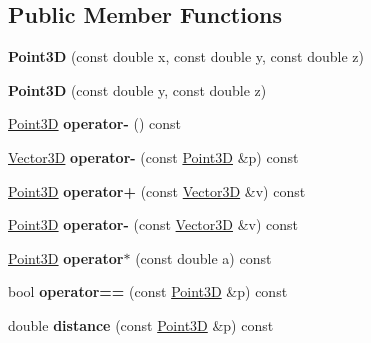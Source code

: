 \subsection*{Public Member Functions}
\begin{DoxyCompactItemize}
\item 
\hypertarget{class_point3_d_a72799f11be08ba98bb37cfcf2fa0bb1f}{}\label{class_point3_d_a72799f11be08ba98bb37cfcf2fa0bb1f} 
{\bfseries Point3D} (const double x, const double y, const double z)
\item 
\hypertarget{class_point3_d_af963fbdffd449c8fc2d0631992a996e1}{}\label{class_point3_d_af963fbdffd449c8fc2d0631992a996e1} 
{\bfseries Point3D} (const double y, const double z)
\item 
\hypertarget{class_point3_d_a7ac9d9c06fe0497d868537d2f6ad9454}{}\label{class_point3_d_a7ac9d9c06fe0497d868537d2f6ad9454} 
\hyperlink{class_point3_d}{Point3D} {\bfseries operator-\/} () const
\item 
\hypertarget{class_point3_d_a6cb0fe83bc148a42fb2cf6f9aa907242}{}\label{class_point3_d_a6cb0fe83bc148a42fb2cf6f9aa907242} 
\hyperlink{class_vector3_d}{Vector3D} {\bfseries operator-\/} (const \hyperlink{class_point3_d}{Point3D} \&p) const
\item 
\hypertarget{class_point3_d_a2ab1c2f322e1845e94414fab67139667}{}\label{class_point3_d_a2ab1c2f322e1845e94414fab67139667} 
\hyperlink{class_point3_d}{Point3D} {\bfseries operator+} (const \hyperlink{class_vector3_d}{Vector3D} \&v) const
\item 
\hypertarget{class_point3_d_a376bb34529614f69a1d79b9633b6ab03}{}\label{class_point3_d_a376bb34529614f69a1d79b9633b6ab03} 
\hyperlink{class_point3_d}{Point3D} {\bfseries operator-\/} (const \hyperlink{class_vector3_d}{Vector3D} \&v) const
\item 
\hypertarget{class_point3_d_a30f07cec680e5e619289ba0c36c00d34}{}\label{class_point3_d_a30f07cec680e5e619289ba0c36c00d34} 
\hyperlink{class_point3_d}{Point3D} {\bfseries operator$\ast$} (const double a) const
\item 
\hypertarget{class_point3_d_a80016919138ae619c4ae603e0c963460}{}\label{class_point3_d_a80016919138ae619c4ae603e0c963460} 
bool {\bfseries operator==} (const \hyperlink{class_point3_d}{Point3D} \&p) const
\item 
\hypertarget{class_point3_d_a3db617345c47ecf25cee2d8bb08712dc}{}\label{class_point3_d_a3db617345c47ecf25cee2d8bb08712dc} 
double {\bfseries distance} (const \hyperlink{class_point3_d}{Point3D} \&p) const
\item 

\end{DoxyCompactItemize}
